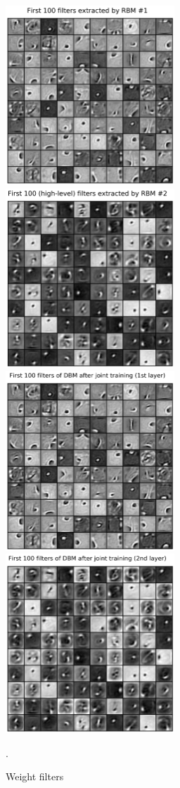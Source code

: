 \begin{figure}[h]
\begin{mdframed}
\centering
\includegraphics[width=2.5in]{dbm-mnist-latest/rbm1.png}
\quad
\includegraphics[width=2.5in]{dbm-mnist-latest/rbm2.png}
\\[2em]
\includegraphics[width=2.5in]{dbm-mnist-latest/W1_joint.png}
\quad
\includegraphics[width=2.5in]{dbm-mnist-latest/W2_joint.png}
\caption{Weight filters}.
\end{mdframed}
\end{figure}

